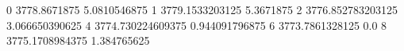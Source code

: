 0 3778.8671875 5.0810546875
1 3779.1533203125 5.3671875
2 3776.852783203125 3.066650390625
4 3774.730224609375 0.944091796875
6 3773.7861328125 0.0
8 3775.1708984375 1.384765625
